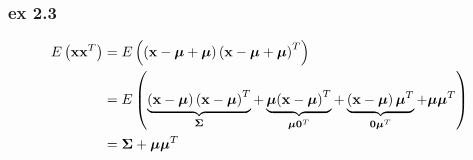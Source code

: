\documentclass[10pt]{article}
\begin{document}
\subsubsection{ex 2.3}
\begin{equation}
\begin{split}
E\left( {\mathbf{x}{\mathbf{x}^T}} \right) &= E\left( {\left( {\mathbf{x} - \boldsymbol{\mu}  + \boldsymbol{\mu} } \right){{\left( {\mathbf{x} - \boldsymbol{\mu}  + \boldsymbol{\mu} } \right)}^T}} \right) \hfill \\
&= E\left( {\underbrace {\left( {\mathbf{x} - \boldsymbol{\mu} } \right){{\left( {\mathbf{x} - \boldsymbol{\mu} } \right)}^T}}_{\boldsymbol{\Sigma}}  + \underbrace {\boldsymbol{\mu} {{\left( {\mathbf{x} - \boldsymbol{\mu} } \right)}^T}}_{\boldsymbol{\mu} {\mathbf{0}^T}} + \underbrace {\left( {\mathbf{x} - \boldsymbol{\mu} } \right){\boldsymbol{\mu} ^T}}_{\mathbf{0}{\boldsymbol{\mu} ^T}} + \boldsymbol{\mu} {\boldsymbol{\mu} ^T}} \right) \hfill \\
&= \boldsymbol{\Sigma}  + \boldsymbol{\mu} {\boldsymbol{\mu} ^T} \hfill \\ 
\end{split}
\end{equation}
\end{document}
